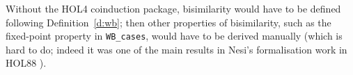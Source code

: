 
Without the  HOL4 coinduction package, bisimilarity would have to be
defined  following 
Definition~\ref{d:wb};  then other properties of bisimilarity, such
as the fixed-point property in \texttt{WB_cases}, would have to be
derived 
manually (which is hard to do; indeed it was one of the main results
in  Nesi's formalisation work  in HOL88 \cite{...}). 





